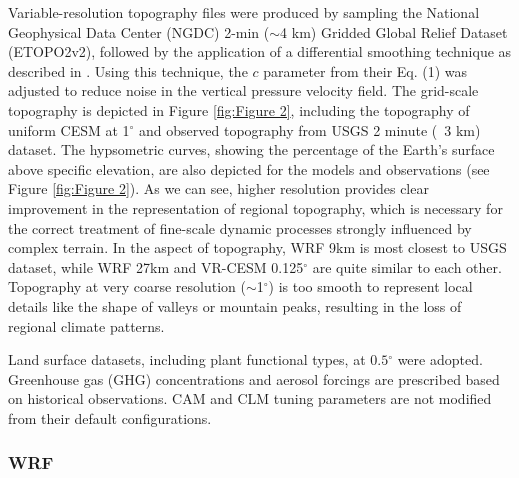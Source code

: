 \documentclass[draft,ms]{agutex}   %
\begin{document}
\begin{article}
Variable-resolution topography files were produced by sampling the National Geophysical Data Center (NGDC) 2-min ($\sim$4 km) Gridded Global Relief Dataset (ETOPO2v2), followed by the application of a differential smoothing technique as described in \cite{zarzycki2015effects}.  Using this technique, the $c$ parameter from their Eq. (1) was adjusted to reduce noise in the vertical pressure velocity field. The grid-scale topography is depicted in Figure \ref{fig:Figure 2}, including the topography of uniform CESM at 1$^\circ$ and observed topography from USGS 2 minute (~3 km) dataset. The hypsometric curves, showing the percentage of the Earth's surface above specific elevation, are also depicted for the models and observations (see Figure \ref{fig:Figure 2}). As we can see, higher resolution provides clear improvement in the representation of regional topography, which is necessary for the correct treatment of fine-scale dynamic processes strongly influenced by complex terrain. In the aspect of topography, WRF 9km is most closest to USGS dataset, while WRF 27km and VR-CESM 0.125$^\circ$ are quite similar to each other. Topography at very coarse resolution ($\sim$1$^\circ$) is too smooth to represent local details like the shape of valleys or mountain peaks, resulting in the loss of regional climate patterns.

Land surface datasets, including plant functional types, at $0.5$$^\circ$ were adopted. Greenhouse gas (GHG) concentrations and aerosol forcings are prescribed based on historical observations. CAM and CLM tuning parameters are not modified from their default configurations.


\subsubsection{WRF} 


\end{article}
\end{document}
